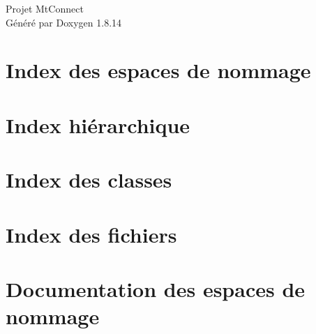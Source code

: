 \documentclass[twoside]{book}
\newcommand{\+}{\discretionary{\mbox{\scriptsize$\hookleftarrow$}}{}{}}
\newcommand{\clearemptydoublepage}{%
  \newpage{\pagestyle{empty}\cleardoublepage}%
}
\begin{document}
\hypersetup{pageanchor=false,
             bookmarksnumbered=true,
             pdfencoding=unicode
            }
\begin{titlepage}
\vspace*{7cm}
\begin{center}%
{\Large Projet Mt\+Connect }\\
\vspace*{1cm}
{\large Généré par Doxygen 1.8.14}\\
\end{center}
\end{titlepage}
\clearemptydoublepage
{}
\tableofcontents
\clearemptydoublepage
{}
\hypersetup{pageanchor=true}

\chapter{Index des espaces de nommage}

\chapter{Index hiérarchique}

\chapter{Index des classes}

\chapter{Index des fichiers}

\chapter{Documentation des espaces de nommage}







\end{document}
